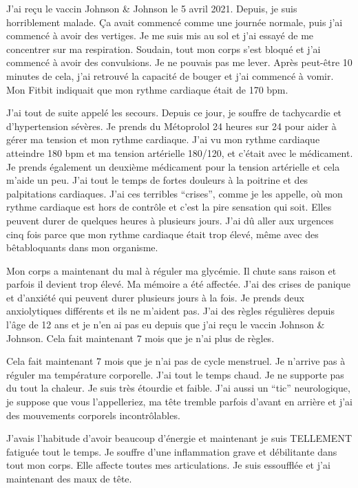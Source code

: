 J'ai reçu le vaccin Johnson \& Johnson le 5 avril 2021. Depuis, je suis
horriblement malade. Ça avait commencé comme une journée normale, puis j'ai
commencé à avoir des vertiges. Je me suis mis au sol et j'ai essayé de me
concentrer sur ma respiration. Soudain, tout mon corps s'est bloqué et j'ai
commencé à avoir des convulsions. Je ne pouvais pas me lever. Après peut-être 10
minutes de cela, j'ai retrouvé la capacité de bouger et j'ai commencé à
vomir. Mon Fitbit indiquait que mon rythme cardiaque était de 170 bpm.

J'ai tout de suite appelé les secours. Depuis ce jour, je souffre de tachycardie
et d'hypertension sévères. Je prends du Métoprolol 24 heures sur 24 pour aider à
gérer ma tension et mon rythme cardiaque. J'ai vu mon rythme cardiaque atteindre
180 bpm et ma tension artérielle 180/120, et c'était avec le médicament. Je
prends également un deuxième médicament pour la tension artérielle et cela
m'aide un peu. J'ai tout le temps de fortes douleurs à la poitrine et des
palpitations cardiaques. J'ai ces terribles ``crises'', comme je les appelle, où
mon rythme cardiaque est hors de contrôle et c'est la pire sensation qui
soit. Elles peuvent durer de quelques heures à plusieurs jours. J'ai dû aller
aux urgences cinq fois parce que mon rythme cardiaque était trop élevé, même
avec des bêtabloquants dans mon organisme.

Mon corps a maintenant du mal à réguler ma glycémie. Il chute sans raison et
parfois il devient trop élevé. Ma mémoire a été affectée. J'ai des crises de
panique et d'anxiété qui peuvent durer plusieurs jours à la fois. Je prends deux
anxiolytiques différents et ils ne m'aident pas. J'ai des règles régulières
depuis l'âge de 12 ans et je n'en ai pas eu depuis que j'ai reçu le vaccin
Johnson \& Johnson. Cela fait maintenant 7 mois que je n'ai plus de règles.

Cela fait maintenant 7 mois que je n'ai pas de cycle menstruel. Je n'arrive pas
à réguler ma température corporelle. J'ai tout le temps chaud. Je ne supporte
pas du tout la chaleur. Je suis très étourdie et faible. J'ai aussi un ``tic''
neurologique, je suppose que vous l'appelleriez, ma tête tremble parfois d'avant
en arrière et j'ai des mouvements corporels incontrôlables.

J'avais l'habitude d'avoir beaucoup d'énergie et maintenant je suis TELLEMENT
fatiguée tout le temps. Je souffre d'une inflammation grave et débilitante dans
tout mon corps. Elle affecte toutes mes articulations. Je suis essoufflée et
j'ai maintenant des maux de tête.


